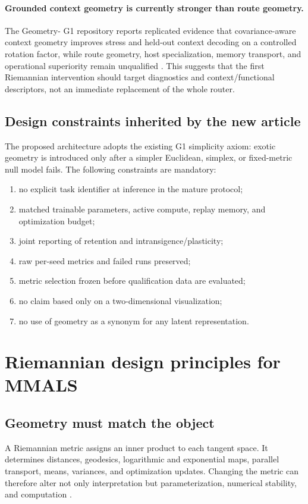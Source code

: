 \paragraph{Grounded context geometry is currently stronger than route geometry.}
The Geometry-\MMALS{} G1 repository reports replicated evidence that covariance-aware context geometry improves stress and held-out context decoding on a controlled rotation factor, while route geometry, host specialization, memory transport, and operational superiority remain unqualified \citep{geometrymmalsg1}. This suggests that the first Riemannian intervention should target diagnostics and context/functional descriptors, not an immediate replacement of the whole router.

\subsection{Design constraints inherited by the new article}
The proposed architecture adopts the existing G1 simplicity axiom: exotic geometry is introduced only after a simpler Euclidean, simplex, or fixed-metric null model fails. The following constraints are mandatory:
\begin{enumerate}[leftmargin=1.7em]
  \item no explicit task identifier at inference in the mature protocol;
  \item matched trainable parameters, active compute, replay memory, and optimization budget;
  \item joint reporting of retention and intransigence/plasticity;
  \item raw per-seed metrics and failed runs preserved;
  \item metric selection frozen before qualification data are evaluated;
  \item no claim based only on a two-dimensional visualization;
  \item no use of geometry as a synonym for any latent representation.
\end{enumerate}


\section{Riemannian design principles for MMALS}

\subsection{Geometry must match the object}
A Riemannian metric assigns an inner product to each tangent space. It determines distances, geodesics, logarithmic and exponential maps, parallel transport, means, variances, and optimization updates. Changing the metric can therefore alter not only interpretation but parameterization, numerical stability, and computation \citep{absil2008,amari2016,chen2026thesis}.

